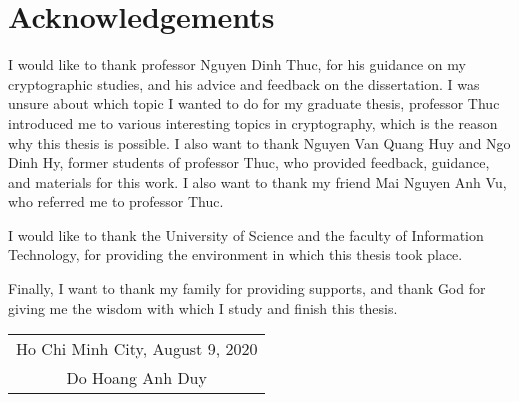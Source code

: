 \chapter{Acknowledgements}

I would like to thank professor Nguyen Dinh Thuc, for his guidance on my cryptographic studies, and his advice and feedback on the dissertation. I was unsure about which topic I wanted to do for my graduate thesis, professor Thuc introduced me to various interesting topics in cryptography, which is the reason why this thesis is possible. I also want to thank Nguyen Van Quang Huy and Ngo Dinh Hy, former students of professor Thuc, who provided feedback, guidance, and materials for this work. I also want to thank my friend Mai Nguyen Anh Vu, who referred me to professor Thuc.

I would like to thank the University of Science and the faculty of Information Technology, for providing the environment in which this thesis took place. 

Finally, I want to thank my family for providing supports, and thank God for giving me the wisdom with which I study and finish this thesis.

\begin{flushright}
\begin{tabular}{@{}c@{}}
Ho Chi Minh City, August 9, 2020 \\
Do Hoang Anh Duy \\
\end{tabular}
\end{flushright}